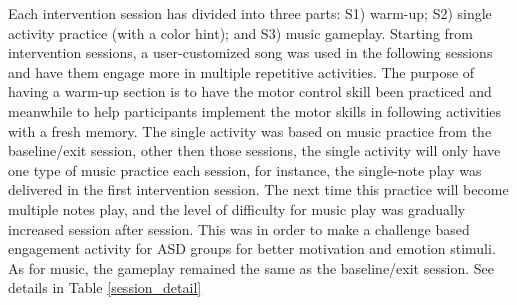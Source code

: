 Each intervention session has divided into three parts: S1) warm-up; S2) single activity practice (with a color hint); 
and S3) music gameplay. Starting from intervention sessions, a user-customized song was used in the following 
sessions and have them engage more in multiple repetitive activities. 
The purpose of having a warm-up section is to have the motor control skill been practiced 
and meanwhile to help participants implement the motor skills in following activities with a fresh memory. The single activity was 
based on music practice from the baseline/exit session, other then those sessions, the single activity will
only have one type of music practice each session, for instance, the single-note play was 
delivered in the first intervention session. The next time this practice will become multiple notes 
play, and the level of difficulty for music play was gradually increased session after session. This was in
order to make a challenge based engagement activity for ASD groups for better motivation and emotion stimuli. 
As for music, the gameplay remained the same as the baseline/exit session. See details in Table \ref{session_detail}\\

